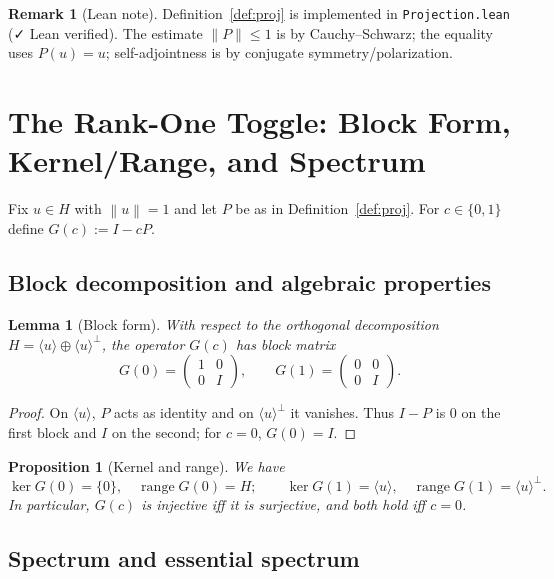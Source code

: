 \documentclass[11pt]{article}
\newtheorem{proposition}[theorem]{Proposition}
\newtheorem{lemma}[theorem]{Lemma}
\theoremstyle{definition}
\newtheorem{remark}[theorem]{Remark}
\newcommand{\norm}[1]{\left\lVert #1\right\rVert}
\DeclareMathOperator{\range}{range}
\DeclareMathOperator{\kerop}{ker}
\newcommand{\leanok}{\textsf{\small \textcolor{green!60!black}{✓ Lean verified}}}
\begin{document}
\begin{remark}[Lean note]
Definition~\ref{def:proj} is implemented in \texttt{Projection.lean} (\leanok). The estimate $\lVert P\rVert\le 1$ is by Cauchy--Schwarz; the equality uses $P(u)=u$; self-adjointness is by conjugate symmetry/polarization.
\end{remark}

\section{The Rank-One Toggle: Block Form, Kernel/Range, and Spectrum}\label{sec:toggle}

Fix $u\in H$ with $\norm{u}=1$ and let $P$ be as in Definition~\ref{def:proj}. For $c\in\{0,1\}$ define $G(c):=I-cP$.

\subsection{Block decomposition and algebraic properties}

\begin{lemma}[Block form]\label{lem:block}
With respect to the orthogonal decomposition $H=\langle u\rangle\oplus \langle u\rangle^\perp$, the operator $G(c)$ has block matrix
\[
G(0)=\begin{pmatrix}1&0\\[2pt]0&I\end{pmatrix},\qquad
G(1)=\begin{pmatrix}0&0\\[2pt]0&I\end{pmatrix}.
\]
\end{lemma}

\begin{proof}
On $\langle u\rangle$, $P$ acts as identity and on $\langle u\rangle^\perp$ it vanishes. Thus $I-P$ is $0$ on the first block and $I$ on the second; for $c=0$, $G(0)=I$.
\end{proof}

\begin{proposition}[Kernel and range]\label{prop:ker-range}
We have
\[
\kerop G(0)=\{0\},\quad \range G(0)=H;\qquad
\kerop G(1)=\langle u\rangle,\quad \range G(1)=\langle u\rangle^\perp.
\]
In particular, $G(c)$ is injective iff it is surjective, and both hold iff $c=0$.
\end{proposition}

\subsection{Spectrum and essential spectrum}
\end{document}
